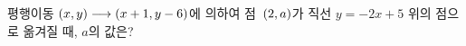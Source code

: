 평행이동 $(x{,}\mkern3mu\mathopen{}y)\longrightarrow(x+1{,}\mkern3mu\mathopen{}y-6)$에 의하여 점~$(2{,}\mkern3mu\mathopen{}a)$가 직선 $y=-2x+5$ 위의 점으로 옮겨질 때, $a$의 값은?
